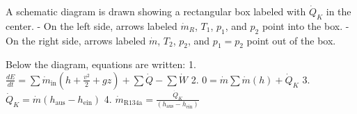 A schematic diagram is drawn showing a rectangular box labeled with \( \dot{Q}_K \) in the center.  
- On the left side, arrows labeled \( \dot{m}_R \), \( T_1 \), \( p_1 \), and \( p_2 \) point into the box.  
- On the right side, arrows labeled \( \dot{m} \), \( T_2 \), \( p_2 \), and \( p_1 = p_2 \) point out of the box.  

Below the diagram, equations are written:  
1. \( \frac{dE}{dt} = \sum \dot{m}_{\text{in}} (h + \frac{v^2}{2} + gz) + \sum \dot{Q} - \sum \dot{W} \)  
2. \( 0 = \dot{m} \sum \dot{m} (h) + \dot{Q}_K \)  
3. \( \dot{Q}_K = \dot{m} (h_{\text{aus}} - h_{\text{ein}}) \)  
4. \( \dot{m}_{\text{R134a}} = \frac{\dot{Q}_K}{(h_{\text{aus}} - h_{\text{ein}})} \)